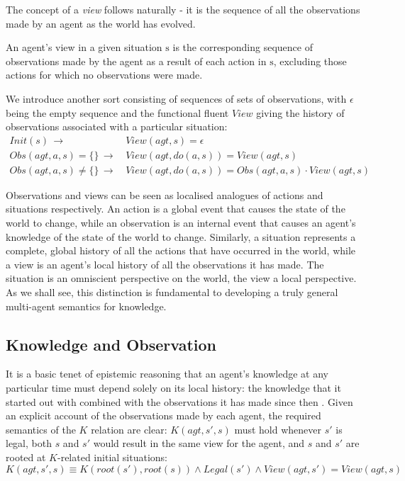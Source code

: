 The concept of a \emph{view} follows naturally - it is the sequence
of all the observations made by an agent as the world has evolved. 

\begin{defnL}
[{Views}] An agent's view in a given situation $\mathrm{s}$ is the
corresponding sequence of observations made by the agent as a result
of each action in $\mathrm{s}$, excluding those actions for which
no observations were made.
\end{defnL}
We introduce another sort  consisting of sequences of
sets of observations, with $\epsilon$ being the empty sequence and
the functional fluent $View$ giving the history of observations associated
with a particular situation:\begin{align}
Init(s)\,\rightarrow & \, View(agt,s)=\epsilon\nonumber \\
Obs(agt,a,s)=\{\}\,\rightarrow & \, View(agt,do(a,s))=View(agt,s)\nonumber \\
Obs(agt,a,s)\neq\{\}\,\rightarrow & \, View(agt,do(a,s))=Obs(agt,a,s)\cdot View(agt,s)\label{eq:view_defn}\end{align}


Observations and views can be seen as localised analogues of actions
and situations respectively. An action is a global event that causes
the state of the world to change, while an observation is an internal
event that causes an agent's knowledge of the state of the world to
change. Similarly, a situation represents a complete, global history
of all the actions that have occurred in the world, while a view is
an agent's local history of all the observations it has made. The
situation is an omniscient perspective on the world, the view a local
perspective. As we shall see, this distinction is fundamental to developing
a truly general multi-agent semantics for knowledge.


\subsection{Knowledge and Observation\label{sub:Knowledge-and-Observation}}

It is a basic tenet of epistemic reasoning that an agent's knowledge
at any particular time must depend solely on its local history: the
knowledge that it started out with combined with the observations
it has made since then \citep{halpern90knowledge_distrib}. Given
an explicit account of the observations made by each agent, the required
semantics of the $K$ relation are clear: $K(agt,s',s)$ must hold
whenever $s'$ is legal, both $s$ and $s'$ would result in the same
view for the agent, and $s$ and $s'$ are rooted at $K$-related
initial situations:\begin{equation}
K(agt,s',s)\equiv K(root(s'),root(s))\wedge Legal(s')\wedge View(agt,s')=View(agt,s)\label{eq:k-desired}\end{equation}


